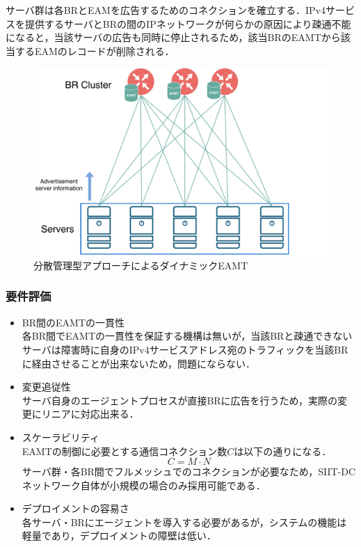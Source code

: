 サーバ群は各BRとEAMを広告するためのコネクションを確立する．IPv4サービスを提供するサーバとBRの間のIPネットワークが何らかの原因により疎通不能になると，当該サーバの広告も同時に停止されるため，該当BRのEAMTから該当するEAMのレコードが削除される．



\begin{figure}[h]
    \begin{center}
      \includegraphics[width=12cm,pagebox=cropbox,clip]{img/approach_distributed_model.pdf}
    \end{center}
    \caption{分散管理型アプローチによるダイナミックEAMT}
    \label{fig:approach_distributed_model}
\end{figure}

\subsubsection{要件評価}

\begin{itemize}
    \item BR間のEAMTの一貫性 \\
    各BR間でEAMTの一貫性を保証する機構は無いが，当該BRと疎通できないサーバは障害時に自身のIPv4サービスアドレス宛のトラフィックを当該BRに経由させることが出来ないため，問題にならない．
    \item 変更追従性 \\
    サーバ自身のエージェントプロセスが直接BRに広告を行うため，実際の変更にリニアに対応出来る．
    \item スケーラビリティ　\\
    EAMTの制御に必要とする通信コネクション数$C$は以下の通りになる．
    \begin{equation}
        C =  M \cdot N 
    \end{equation}
    サーバ群・各BR間でフルメッシュでのコネクションが必要なため，SIIT-DCネットワーク自体が小規模の場合のみ採用可能である．

    \item デプロイメントの容易さ　\\
    各サーバ・BRにエージェントを導入する必要があるが，システムの機能は軽量であり，デプロイメントの障壁は低い．
\end{itemize}

